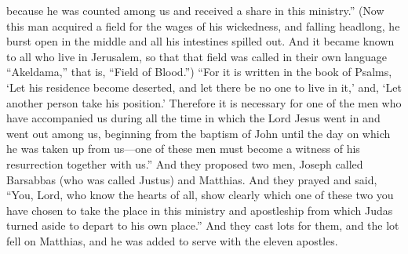 \begin{biblechapter}
\verse because he was counted among us and received a share in this ministry.”
\verse (Now this man acquired a field for the wages of his wickedness, and falling headlong, he burst open in the middle and all his intestines spilled out.
\verse And it became known to all who live in Jerusalem, so that that field was called in their own language “Akeldama,” that is, “Field of Blood.”)
\verse “For it is written in the book of Psalms, ‘Let his residence become deserted, 
and let there be no one to live in it,’ and, ‘Let another person take his position.’
\verse Therefore it is necessary for one of the men who have accompanied us during all the time in which the Lord Jesus went in and went out among us,
\verse beginning from the baptism of John until the day on which he was taken up from us—one of these men must become a witness of his resurrection together with us.”
\verse And they proposed two men, Joseph called Barsabbas (who was called Justus) and Matthias.
\verse And they prayed and said, “You, Lord, who know the hearts of all, show clearly which one of these two you have chosen
\verse to take the place in this ministry and apostleship from which Judas turned aside to depart to his own place.”
\verse And they cast lots for them, and the lot fell on Matthias, and he was added to serve with the eleven apostles.
\end{biblechapter}

